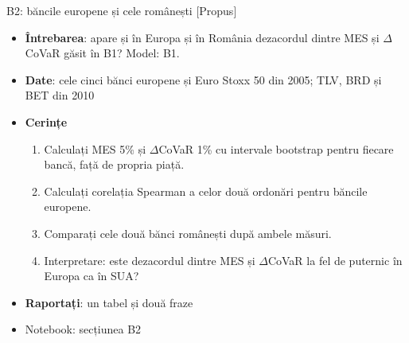 \begin{frame}{B2: băncile europene și cele românești [Propus]}
\itemsize{\footnotesize}
\begin{itemize}
\item \textbf{Întrebarea}: apare și în Europa și în România dezacordul dintre MES și $\Delta$CoVaR găsit în B1? Model: B1.
\item \textbf{Date}: cele cinci bănci europene și Euro Stoxx 50 din 2005; TLV, BRD și BET din 2010
\item \textbf{Cerințe}
\begin{enumerate}
    \item Calculați MES 5\% și $\Delta$CoVaR 1\% cu intervale bootstrap pentru fiecare bancă, față de propria piață.
    \item Calculați corelația Spearman a celor două ordonări pentru băncile europene.
    \item Comparați cele două bănci românești după ambele măsuri.
    \item Interpretare: este dezacordul dintre MES și $\Delta$CoVaR la fel de puternic în Europa ca în SUA?
\end{enumerate}
\item \textbf{Raportați}: un tabel și două fraze
\item Notebook: secțiunea B2
\end{itemize}
\end{frame}

